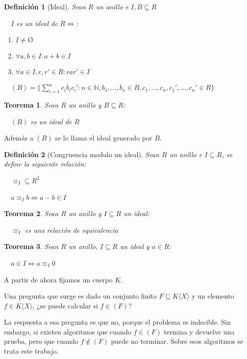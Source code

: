 \documentclass{amsbook}
\theoremstyle{customstyle}
\newtheorem{definition}{Definición}[section]
\newtheorem{theorem}{Teorema}[section]
\begin{document}
\begin{definition}[Ideal]\label{def:ideal}
Sean $R$ un anillo e $I, B ⊆ R$

  $I$ es un ideal de $R ⇔$:
\begin{enumerate}[label = (\alph*)]
\item $I ≠ Ø$

\item $∀a, b ∈ I : a + b ∈ I$

\item $∀a ∈ I, r, r' ∈ R : r a r' ∈ I$
\end{enumerate}

  $(B) = \{∑_{i = 1}^n c_i b_i c_i' : n ∈ ℕ, b_1, …, b_n ∈ B, c_1, …, c_n, c_1', …, c_n' ∈ R\}$
\end{definition}

\begin{theorem}
Sean $R$ un anillo y $B ⊆ R$:

  $(B)$ es un ideal de $R$

\end{theorem}

Además a $(B)$ se lo llama el ideal generado por $B$.

\begin{definition}[Congruencia modulo un ideal]\label{def:congruencia mod ideal}
Sean $R$ un anillo e $I ⊆ R$, se define la siguiente relación:

  $≡_I ⊆ R^2$

  $a ≡_I b ⇔ a - b ∈ I$

\end{definition}

\begin{theorem}\label{thm:congruencia mod ideal es equivalencia}
Sean $R$ un anillo y $I ⊆ R$ un ideal:

  $≡_I$ es una relación de equivalencia
\end{theorem}

\begin{theorem}\label{thm:en ideal ⇔ congruente 0}
Sean $R$ un anillo, $I ⊆ R$ un ideal y $a ∈ R$:

  $a ∈ I ⇔ a ≡_I 0$
\end{theorem}


A partir de ahora fijamos un cuerpo $K$.

Una pregunta que surge es dado un conjunto finito $F ⊆ K⟨X⟩$ y un elemento $f ∈ K⟨X⟩$, ¿se puede calcular si $f ∈ (F)$?

La respuesta a esa pregunta es que no, porque el problema es indecible. Sin embargo, si existen algoritmos que cuando $f ∈ (F)$ termina y devuelve una prueba, pero que cuando $f ∉ (F)$ puede no terminar. Sobre esos algoritmos se trata este trabajo.
\end{document}
